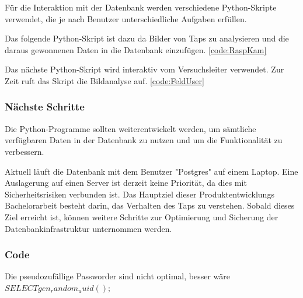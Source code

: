 Für die Interaktion mit der Datenbank werden verschiedene Python-Skripte verwendet, die je nach Benutzer unterschiedliche Aufgaben erfüllen.

Das folgende Python-Skript ist dazu da Bilder von Taps zu analysieren und die daraus gewonnenen Daten in die Datenbank einzufügen. \ref{code:RaspKam}

Das nächste Python-Skript wird interaktiv vom Versuchsleiter verwendet. Zur Zeit ruft das Skript die Bildanalyse auf. \ref{code:FeldUser}


\subsubsection{Nächste Schritte}

Die Python-Programme sollten weiterentwickelt werden, um sämtliche verfügbaren Daten in der Datenbank zu nutzen und um die Funktionalität zu verbessern.

Aktuell läuft die Datenbank mit dem Benutzer "Postgres" auf einem Laptop. Eine Auslagerung auf einen Server ist derzeit keine Priorität, da dies mit Sicherheitsrisiken verbunden ist. Das Hauptziel dieser Produktentwicklungs Bachelorarbeit besteht darin, das Verhalten des Taps zu verstehen. Sobald dieses Ziel erreicht ist, können weitere Schritte zur Optimierung und Sicherung der Datenbankinfrastruktur unternommen werden.

\subsubsection{Code}
\label{sect:code}



Die pseudozufällige Passworder sind nicht optimal, besser wäre $SELECT gen_random_uuid();$











